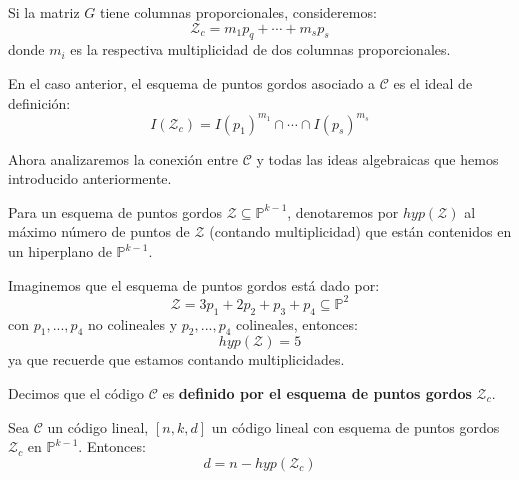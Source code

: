 \documentclass[12pt]{report}
\theoremstyle{largebreak}
\begin{document}
    Si la matriz $G$ tiene columnas proporcionales, consideremos:
    \begin{equation*}
        \mathcal{Z}_c=m_1p_q+\cdots+m_sp_s
    \end{equation*}
    donde $m_i$ es la respectiva multiplicidad de dos columnas proporcionales.

    \begin{mydef}
        En el caso anterior, el esquema de puntos gordos asociado a $\mathcal{C}$ es el ideal de definición:
        \begin{equation*}
            I(\mathcal{Z}_c)=I(p_1)^{ m_1}\cap\cdots\cap I(p_s)^{ m_s}
        \end{equation*}
    \end{mydef}

    Ahora analizaremos la conexión entre $\mathcal{C}$ y todas las ideas algebraicas que hemos introducido anteriormente.

    \begin{mydef}
        Para un esquema de puntos gordos $\mathcal{Z}\subseteq\mathbb{P}^{ k-1}$, denotaremos por $hyp(\mathcal{Z})$ al máximo número de puntos de $\mathcal{Z}$ (contando multiplicidad) que están contenidos en un hiperplano de $\mathbb{P}^{ k-1}$.
    \end{mydef}

    \begin{exa}
        Imaginemos que el esquema de puntos gordos está dado por:
        \begin{equation*}
            \mathcal{Z}=3p_1+2p_2+p_3+p_4\subseteq\mathbb{P}^2
        \end{equation*}
        con $p_1,...,p_4$ no colineales y $p_2,...,p_4$ colineales, entonces:
        \begin{equation*}
            hyp(\mathcal{Z})=5
        \end{equation*}
        ya que recuerde que estamos contando multiplicidades.
    \end{exa}

    \begin{mydef}
        Decimos que el código $\mathcal{C}$ es \textbf{definido por el esquema de puntos gordos} $\mathcal{Z}_c$.
    \end{mydef}

    \begin{propo}
        Sea $\mathcal{C}$ un código lineal, $[n,k,d]$ un código lineal con esquema de puntos gordos $\mathcal{Z}_c$ en $\mathbb{P}^{ k-1}$. Entonces:
        \begin{equation*}
            d=n-hyp(\mathcal{Z}_c)
        \end{equation*}
    \end{propo}
\end{document}
